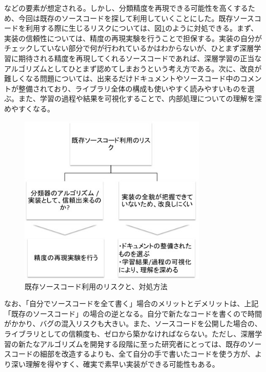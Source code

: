 などの要素が想定される。しかし、分類精度を再現できる可能性を高くするため、今回は既存のソースコードを探して利用していくことにした。既存ソースコードを利用する際に生じるリスクについては、図\ref{c4_library_hedge}のように対処できる。まず、実装の信頼性については、精度の再現実験を行うことで担保する。実装の自分がチェックしていない部分で何が行われているかはわからないが、ひとまず深層学習に期待される精度を再現してくれるソースコードであれば、深層学習の正当なアルゴリズムとしてひとまず認めてしまおうという考え方である。次に、改良が難しくなる問題については、出来るだけドキュメントやソースコード中のコメントが整備されており、ライブラリ全体の構成も使いやすく読みやすいものを選ぶ。また、学習の過程や結果を可視化することで、内部処理についての理解を深めやすくなる。\par

\begin{figure}[tbp]
 \begin{center}
  \includegraphics[width=90mm]{img/c4/library_hedge}
 \end{center}
 \caption{既存ソースコード利用のリスクと、対処方法}
 \label{c4_library_hedge}
\end{figure}
なお、「自分でソースコードを全て書く」場合のメリットとデメリットは、上記「既存のソースコード」の場合の逆となる。自分で新たなコードを書くので時間がかかり、バグの混入リスクも大きい。また、ソースコードを公開した場合の、ライブラリとしての信頼度も、ゼロから築かなければならない。ただし、深層学習の新たなアルゴリズムを開発する段階に至った研究者にとっては、既存のソースコードの細部を改造するよりも、全て自分の手で書いたコードを使う方が、より深い理解を得やすく、確実で素早い実装ができる可能性もある。

